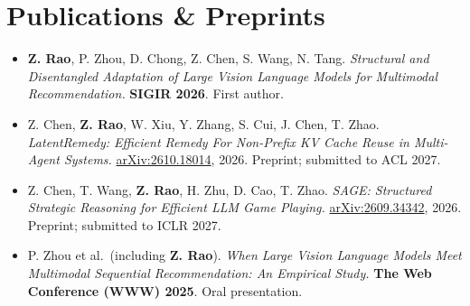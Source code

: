 \documentclass{resume}
\begin{document}
\section{Publications \& Preprints}
\begin{itemize}
  \item \textbf{Z. Rao}, P. Zhou, D. Chong, Z. Chen, S. Wang, N. Tang.
  \textit{Structural and Disentangled Adaptation of Large Vision Language Models for Multimodal Recommendation.}
  \textbf{SIGIR 2026}. First author.

  \item Z. Chen, \textbf{Z. Rao}, W. Xiu, Y. Zhang, S. Cui, J. Chen, T. Zhao.
  \textit{LatentRemedy: Efficient Remedy For Non-Prefix KV Cache Reuse in Multi-Agent Systems.}
  \href{https://arxiv.org/abs/2610.18014}{arXiv:2610.18014}, 2026. Preprint; submitted to ACL 2027.

  \item Z. Chen, T. Wang, \textbf{Z. Rao}, H. Zhu, D. Cao, T. Zhao.
  \textit{SAGE: Structured Strategic Reasoning for Efficient LLM Game Playing.}
  \href{https://arxiv.org/abs/2609.34342}{arXiv:2609.34342}, 2026. Preprint; submitted to ICLR 2027.

  \item P. Zhou et al.\ (including \textbf{Z. Rao}).
  \textit{When Large Vision Language Models Meet Multimodal Sequential Recommendation: An Empirical Study.}
  \textbf{The Web Conference (WWW) 2025}. Oral presentation.
\end{itemize}
\end{document}

